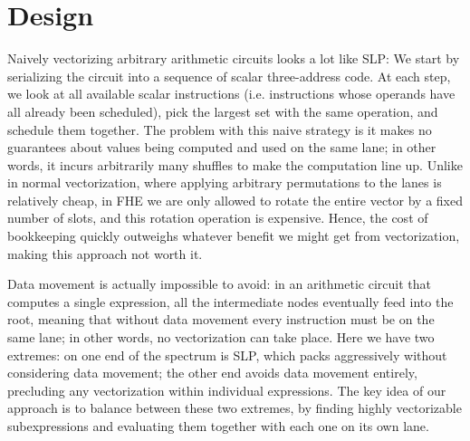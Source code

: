 \section{Design}\label{sec:design}


Naively vectorizing arbitrary arithmetic circuits looks a lot like SLP: We start by serializing the circuit into a sequence of scalar three-address code.
At each step, we look at all available scalar instructions (i.e. instructions whose operands have all already been scheduled), pick the largest set with the same operation, and schedule them together.
The problem with this naive strategy is it makes no guarantees about values being computed and used on the same lane; in other words, it incurs arbitrarily many shuffles to make the computation line up.
Unlike in normal vectorization, where applying arbitrary permutations to the lanes is relatively cheap, in FHE we are only allowed to rotate the entire vector by a fixed number of slots, and this rotation operation is expensive.
Hence, the cost of bookkeeping quickly outweighs whatever benefit we might get from vectorization, making this approach not worth it.

Data movement is actually impossible to avoid: in an arithmetic circuit that computes a single expression, all the intermediate nodes eventually feed into the root, meaning that without data movement every instruction must be on the same lane; in other words, no vectorization can take place.
Here we have two extremes: on one end of the spectrum is SLP, which packs aggressively without considering data movement; the other end avoids data movement entirely, precluding any vectorization within individual expressions.
The key idea of our approach is to balance between these two extremes, by finding highly vectorizable subexpressions and evaluating them together with each one on its own lane.
